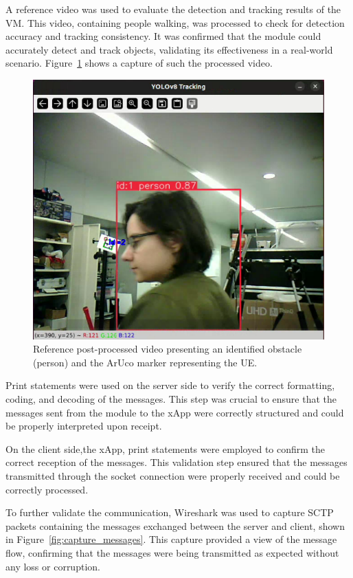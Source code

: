 A reference video was used to evaluate the detection and tracking results of the VM\@.
This video, containing people walking, was processed to check for detection accuracy and tracking consistency.
It was confirmed that the module could accurately detect and track objects, validating its effectiveness in a real-world scenario.
Figure~\ref{fig:reference_video} shows a capture of such the processed video.


\begin{figure}[H]
    \centering
    \includegraphics[width=0.7\linewidth]{figures/reference_frame}
    \caption{Reference post-processed video presenting an identified obstacle (person) and the ArUco marker representing the UE.}
    \label{fig:reference_video}
\end{figure}

Print statements were used on the server side to verify the correct formatting, coding, and decoding of the messages.
This step was crucial to ensure that the messages sent from the module to the xApp were correctly structured and could be properly interpreted upon receipt.

On the client side,the xApp, print statements were employed to confirm the correct reception of the messages.
This validation step ensured that the messages transmitted through the socket connection were properly received and could be correctly processed.

To further validate the communication, Wireshark was used to capture SCTP packets containing the messages exchanged between the server and client, shown in Figure~\ref{fig:capture_messages}.
This capture provided a view of the message flow, confirming that the messages were being transmitted as expected without any loss or corruption.

